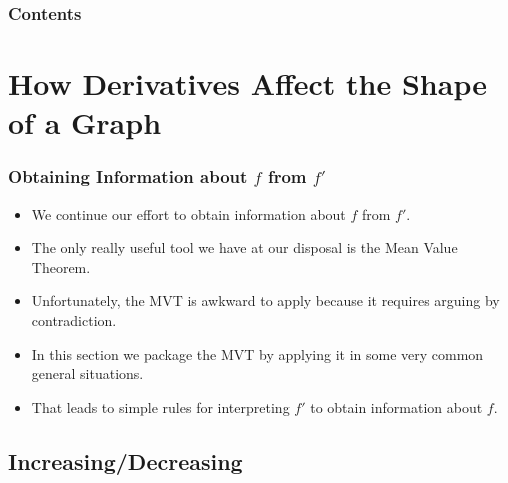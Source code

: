 \documentclass[serif,ignorenonframetext]{beamer}
\title{\commonTitleZeroThreeThree}
\subtitle{\commonSubtitleZeroThreeThree}
\author{\commonAuthor}
\institute{\commonInstitute}
\date{\commonDateZeroThreeThree}
\begin{document}

\begin{frame}
  \titlepage
\end{frame}

\begin{frame}
  \frametitle{Contents}
  \tableofcontents
\end{frame}

%  


\section{How Derivatives Affect the Shape of a Graph}

\begin{frame}
  \frametitle{Obtaining Information about $f$ from $f'$}
  \begin{itemize}[<+->]
  \item We continue our effort to obtain information about $f$ from $f'$.
  \item The only really useful 
    tool we have at our disposal is the Mean Value Theorem.
  \item Unfortunately, the MVT is awkward to apply because it requires
    arguing by contradiction.
  \item In this section we package the MVT by applying it in some very 
    common general situations.
  \item That leads to simple rules for interpreting $f'$ to obtain
    information about $f$.
  \end{itemize}
\end{frame}


\subsection{Increasing/Decreasing}
\end{document}
